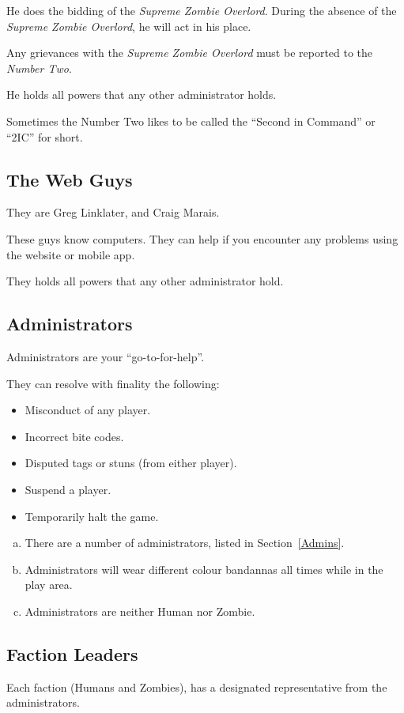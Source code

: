 \documentclass[a4paper,12pt]{article}
\newcommand{\theWebDude}{Greg Linklater}
\newcommand{\theOtherWebdude}{Craig Marais}
\begin{document}
He does the bidding of the \emph{Supreme Zombie Overlord}. During the absence of the \emph{Supreme Zombie Overlord}, he will act in his place.

Any grievances with the \emph{Supreme Zombie Overlord} must be reported to the \emph{Number Two}.

He holds all powers that any other administrator holds.

Sometimes the Number Two likes to be called the ``Second in Command'' or ``2IC'' for short.

\subsection{The Web Guys}
They are \theWebDude, and \theOtherWebdude.

These guys know computers. They can help if you encounter any problems using the website or mobile app.

They holds all powers that any other administrator hold.

\subsection{Administrators}

Administrators are your ``go-to-for-help''.

They can resolve with finality the following:

\begin{itemize}
    \item {Misconduct of any player.}
    \item {Incorrect bite codes.}
    \item {Disputed tags or stuns (from either player).}
    \item {Suspend a player.}
    \item {Temporarily halt the game.}
\end{itemize}

\begin{enumerate}[(a)]
    \item There are a number of administrators, listed in Section~\ref{Admins}.
    \item Administrators will wear different colour bandannas all times while in the play area.
    \item Administrators are neither Human nor Zombie.
\end{enumerate}{}

\subsection{Faction Leaders}
Each faction (Humans and Zombies), has a designated representative from the administrators.\\
\end{document}
